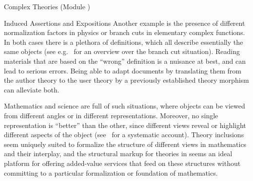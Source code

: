 \begin{tchapter}[id=complex-theories,short=Complex Theories]{Complex Theories (Module
    )}
\begin{tsection}[id=induced-assertions,short=Induced Assertions]{Induced Assertions and Expositions}
Another example is the presence of different normalization factors in physics or branch
cuts in elementary complex functions. In both cases there is a plethora of definitions,
which all describe essentially the same objects (see e.g.~\cite{BraCor:raefca02} for an
overview over the branch cut situation). Reading materials that are based on the ``wrong''
definition is a nuisance at best, and can lead to serious errors. Being able to adapt
documents by translating them from the author theory to the user theory by a previously
established theory morphism can alleviate both.

Mathematics and science are full of such situations, where objects can be viewed from
different angles or in different representations. Moreover, no single representation is
``better'' than the other, since different views reveal or highlight different aspects of
the object (see~\cite{KohKoh:esmk05} for a systematic account). Theory inclusions seem
uniquely suited to formalize the structure of different views in mathematics and their
interplay, and the structural markup for theories in \omdoc seems an ideal platform for
offering added-value services that feed on these structures without committing to a
particular formalization or foundation of mathematics.
\end{tsection}

\end{tchapter}

